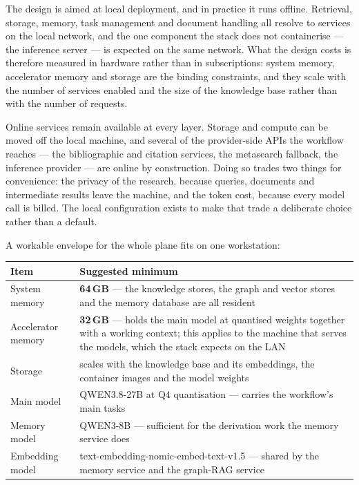 \documentclass[10pt]{article}
\newcommand{\mono}[1]{{\ttfamily\small #1}}
\begin{document}
The design is aimed at local deployment, and in practice it runs offline. Retrieval, storage, memory,
task management and document handling all resolve to services on the local network, and the one
component the stack does not containerise --- the inference server --- is expected on the same
network. What the design costs is therefore measured in hardware rather than in subscriptions:
system memory, accelerator memory and storage are the binding constraints, and they scale with the
number of services enabled and the size of the knowledge base rather than with the number of
requests.

Online services remain available at every layer. Storage and compute can be moved off the local
machine, and several of the provider-side APIs the workflow reaches --- the bibliographic and
citation services, the metasearch fallback, the inference provider --- are online by construction.
Doing so trades two things for convenience: the privacy of the research, because queries, documents
and intermediate results leave the machine, and the token cost, because every model call is billed.
The local configuration exists to make that trade a deliberate choice rather than a default.

A workable envelope for the whole plane fits on one workstation:

\begin{center}
\small
\begin{tabularx}{\textwidth}{@{}>{\raggedright\arraybackslash}p{3.6cm} X@{}}
\toprule
\textbf{Item} & \textbf{Suggested minimum} \\
\midrule
System memory & \textbf{64\,GB} --- the knowledge stores, the graph and vector stores and the memory
database are all resident \\
Accelerator memory & \textbf{32\,GB} --- holds the main model at quantised weights together with a
working context; this applies to the machine that serves the models, which the stack expects on the
LAN \\
Storage & scales with the knowledge base and its embeddings, the container images and the model
weights \\
Main model & \mono{QWEN3.8-27B} at Q4 quantisation --- carries the workflow's main tasks \\
Memory model & \mono{QWEN3-8B} --- sufficient for the derivation work the memory service does \\
Embedding model & \mono{text-embedding-nomic-embed-text-v1.5} --- shared by the memory service and
the graph-RAG service \\
\bottomrule
\end{tabularx}
\end{center}
\end{document}
